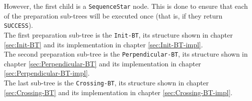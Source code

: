     However, the first child is a \texttt{SequenceStar} node. This is done to ensure that each of the preparation sub-trees will be executed once (that is, if they return \texttt{SUCCESS}).\\
    The first preparation sub-tree is the \texttt{Init-BT}, its structure shown in chapter \ref{sec:Init-BT} and its implementation in chapter \ref{sec:Init-BT-impl}.\\
    The second preparation sub-tree is the \texttt{Perpendicular-BT}, its structure shown in chapter \ref{sec:Perpendicular-BT} and its implementation in chapter \ref{sec:Perpendicular-BT-impl}.\\
    The last sub-tree is the \texttt{Crossing-BT}, its structure shown in chapter \ref{sec:Crossing-BT} and its implementation in chapter \ref{sec:Crossing-BT-impl}.

